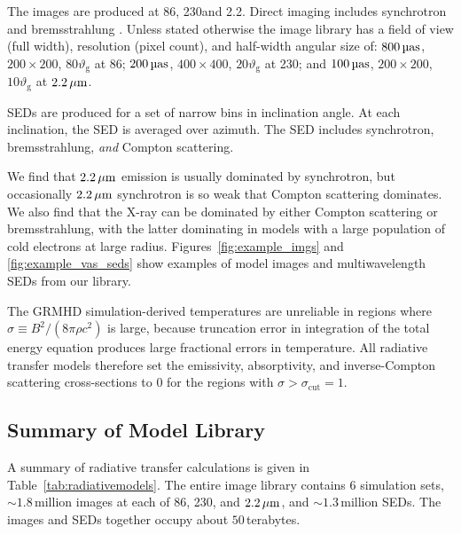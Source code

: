 The images are produced at 86\GHz, 230\GHz and 2.2\um.
Direct imaging includes synchrotron and bremsstrahlung \citep[both ion-electron and electron-electron; see][for a recent review]{2020ApJ...898...50Y}.
Unless stated otherwise the image library has a field of view (full width), resolution (pixel count), and half-width angular size of: $800\uas$, $200 \times 200$, $80 \vartheta_\mathrm{g}$ at 86\GHz; $200\uas$, $400 \times 400$, $20 \vartheta_\mathrm{g}$ at 230\GHz; and $100\uas$, $200\times 200$, $10 \vartheta_\mathrm{g}$ at $2.2\,\mu\mathrm{m}$.

SEDs are produced for a set of narrow bins in inclination angle.
At each inclination, the SED is averaged over azimuth.
The SED includes synchrotron, bremsstrahlung, \emph{and} Compton scattering.

We find that $2.2\,\mu\mathrm{m}$ emission is usually dominated by synchrotron, but occasionally $2.2\,\mu\mathrm{m}$ synchrotron is so weak that Compton scattering dominates.
We also find that the X-ray can be dominated by either Compton scattering or bremsstrahlung, with the latter dominating in models with a large population of cold electrons at large radius.
Figures~\ref{fig:example_imgs} and \ref{fig:example_vas_seds} show examples of model images and multiwavelength SEDs from our library.

The GRMHD simulation-derived temperatures are unreliable in regions where $\sigma \equiv B^2/(8\pi\rho c^2)$ is large, because truncation error in integration of the total energy equation produces large fractional errors in temperature.
All radiative transfer models therefore set the emissivity, absorptivity, and inverse-Compton scattering cross-sections to $0$ for the regions with $\sigma > \sigma_\mathrm{cut} = 1$.

\subsection{Summary of \texorpdfstring{\sgra}{Sgr A*} Model Library}


A summary of radiative transfer calculations is given in Table~\ref{tab:radiativemodels}.
The entire image library contains $6$ simulation sets,  $\sim 1.8$\,million images at each of 86\GHz, 230\GHz, and $2.2\,\mu\mathrm{m}$, and $\sim 1.3$\,million SEDs.
The images and SEDs together occupy about $50$\,terabytes.

